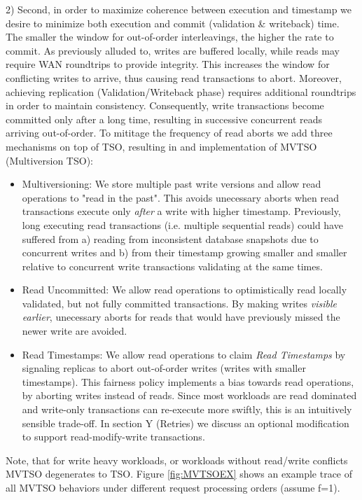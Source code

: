 2) Second, in order to maximize coherence between execution and timestamp we desire to minimize both execution and commit (validation \& writeback) time. The smaller the window for out-of-order interleavings, the higher the rate to commit. As previously alluded to, writes are buffered locally, while reads may require WAN roundtrips to provide integrity. This increases the window for conflicting writes to arrive, thus causing read transactions to abort.
Moreover, achieving replication (Validation/Writeback phase) requires additional roundtrips in order to maintain consistency. Consequently, write transactions become committed only after a long time, resulting in successive concurrent reads arriving out-of-order.
To mititage the frequency of read aborts we add three mechanisms on top of TSO, resulting in and implementation of MVTSO (Multiversion TSO):
\begin{itemize}
\item Multiversioning: We store multiple past write versions and allow read operations to "read in the past". This avoids unecessary aborts when read transactions execute only \textit{after} a write with higher timestamp. Previously, long executing read transactions (i.e. multiple sequential reads) could have suffered from a) reading from inconsistent database snapshots due to concurrent writes and b) from their timestamp growing smaller and smaller relative to concurrent write transactions validating at the same times. 
\item Read Uncommitted: We allow read operations to optimistically read locally validated, but not fully committed transactions. By making writes \textit{visible earlier}, unecessary aborts for reads that would have previously missed the newer write are avoided.
\item Read Timestamps: We allow read operations to claim \textit{Read Timestamps} by signaling replicas to abort out-of-order writes (writes with smaller timestamps). This fairness policy implements a bias towards read operations, by aborting writes instead of reads. Since most workloads are read dominated and write-only transactions can re-execute more swiftly, this is an intuitively sensible trade-off. In section Y (Retries) 	we discuss an optional modification to support read-modify-write transactions. 
\end{itemize}

Note, that for write heavy workloads, or workloads without read/write conflicts MVTSO degenerates to TSO.
Figure \ref{fig:MVTSOEX} shows an example trace of all MVTSO behaviors under different request processing orders (assume f=1).

